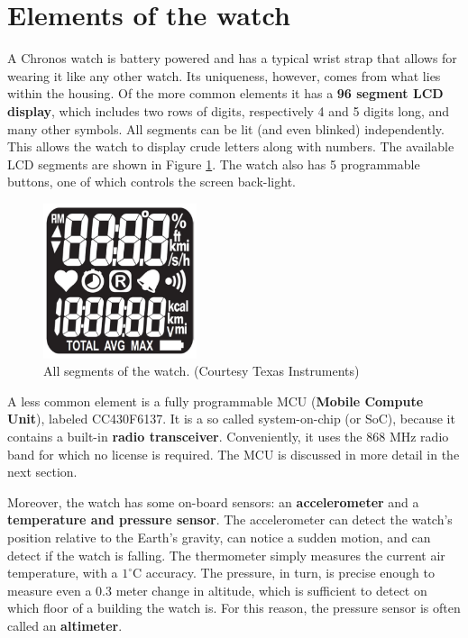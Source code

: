 \section{Elements of the watch}
A Chronos watch is battery powered and has a typical wrist strap that
allows for wearing it like any other watch. Its uniqueness, however,
comes from what lies within the housing. Of the more common elements
it has a {\bf 96 segment LCD display}, which includes two rows of
digits, respectively 4 and 5 digits long, and many other symbols. All
segments can be lit (and even blinked) independently.  This allows the
watch to display crude letters along with numbers. The available LCD
segments are shown in Figure \ref{fig:chronos_segs}.  The watch also
has 5 programmable buttons, one of which controls the screen
back-light.

\begin{figure}[h]
  \centering
  \includegraphics[width=0.4\textwidth]{img/chronos_segs.png}
  \caption{All segments of the watch. (Courtesy Texas
  Instruments)}
  \label{fig:chronos_segs}
\end{figure}

A less common element is a fully programmable MCU ({\bf Mobile Compute
Unit}), labeled CC430F6137. It is a so called system-on-chip (or
SoC), because it contains a built-in {\bf radio transceiver}.
Conveniently, it uses the 868 MHz radio band for which no license is
required. The MCU is discussed in more detail in the next section.

Moreover, the watch has some on-board sensors: an {\bf accelerometer}
and a {\bf temperature and pressure sensor}. The accelerometer can
detect the watch's position relative to the Earth's gravity, can notice a
sudden motion, and can detect if the watch is falling. The thermometer
simply measures the current air temperature, with a $1^{\circ}$C
accuracy. The pressure, in turn, is precise enough to measure even a
0.3 meter change in altitude, which is sufficient to detect on which
floor of a building the watch is. For this reason, the pressure sensor
is often called an {\bf altimeter}.


